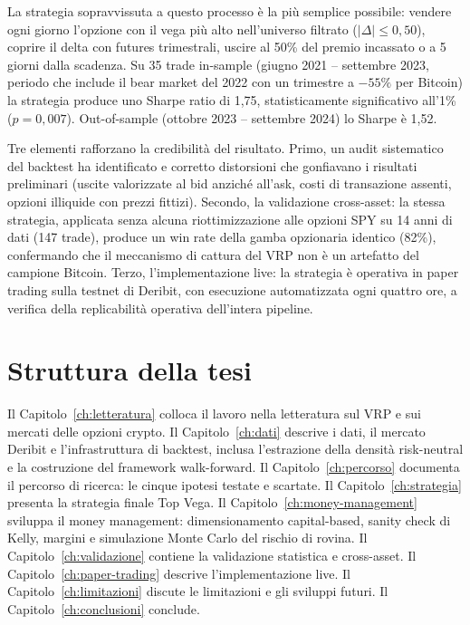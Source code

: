 La strategia sopravvissuta a questo processo è la più semplice possibile:
vendere ogni giorno l'opzione con il vega più alto nell'universo filtrato
($|\Delta| \le 0{,}50$), coprire il delta con futures trimestrali, uscire
al 50\% del premio incassato o a 5 giorni dalla scadenza. Su 35 trade
in-sample (giugno 2021 -- settembre 2023, periodo che include il bear
market del 2022 con un trimestre a $-55\%$ per Bitcoin) la strategia
produce uno Sharpe ratio di 1,75, statisticamente significativo all'1\%
($p = 0{,}007$). Out-of-sample (ottobre 2023 -- settembre 2024) lo Sharpe è
1,52.

Tre elementi rafforzano la credibilità del risultato. Primo, un audit
sistematico del backtest ha identificato e corretto distorsioni che
gonfiavano i risultati preliminari (uscite valorizzate al bid anziché
all'ask, costi di transazione assenti, opzioni illiquide con prezzi
fittizi). Secondo, la validazione cross-asset: la stessa strategia,
applicata senza alcuna riottimizzazione alle opzioni SPY su 14 anni di dati
(147 trade), produce un win rate della gamba opzionaria identico (82\%),
confermando che il meccanismo di cattura del VRP non è un artefatto del
campione Bitcoin. Terzo, l'implementazione live: la strategia è operativa
in paper trading sulla testnet di Deribit, con esecuzione automatizzata
ogni quattro ore, a verifica della replicabilità operativa dell'intera
pipeline.

\section{Struttura della tesi}
\label{sec:intro-struttura}

Il Capitolo~\ref{ch:letteratura} colloca il lavoro nella letteratura sul
VRP e sui mercati delle opzioni crypto. Il
Capitolo~\ref{ch:dati} descrive i dati, il mercato Deribit e
l'infrastruttura di backtest, inclusa l'estrazione della densità
risk-neutral e la costruzione del framework walk-forward. Il
Capitolo~\ref{ch:percorso} documenta il percorso di ricerca: le cinque
ipotesi testate e scartate. Il Capitolo~\ref{ch:strategia} presenta la
strategia finale Top Vega. Il Capitolo~\ref{ch:money-management} sviluppa
il money management: dimensionamento capital-based, sanity check di Kelly,
margini e simulazione Monte Carlo del rischio di rovina. Il
Capitolo~\ref{ch:validazione} contiene la validazione statistica e
cross-asset. Il Capitolo~\ref{ch:paper-trading} descrive l'implementazione
live. Il Capitolo~\ref{ch:limitazioni} discute le limitazioni e gli
sviluppi futuri. Il Capitolo~\ref{ch:conclusioni} conclude.
